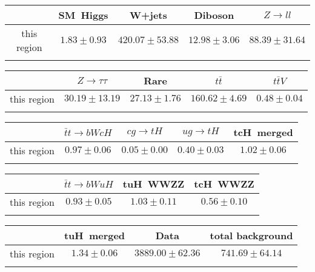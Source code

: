 \centering
\begin{tabular}{ccccc} \toprule\toprule
 & SM~Higgs & W+jets & Diboson & $Z\to ll$\\\midrule
this region & $1.83\pm0.93$ & $420.07\pm53.88$ & $12.98\pm3.06$ & $88.39\pm31.64$\\
\bottomrule\bottomrule\\
\end{tabular}
\begin{tabular}{ccccc} \toprule\toprule
 & $Z\to \tau\tau$ & Rare & $t\bar{t}$ & $t\bar{t}V$\\\midrule
this region & $30.19\pm13.19$ & $27.13\pm1.76$ & $160.62\pm4.69$ & $0.48\pm0.04$\\
\bottomrule\bottomrule\\
\end{tabular}
\begin{tabular}{ccccc} \toprule\toprule
 & $\bar{t}t\to bWcH$ & $cg\to tH$ & $ug\to tH$ & tcH~merged\\\midrule
this region & $0.97\pm0.06$ & $0.05\pm0.00$ & $0.40\pm0.03$ & $1.02\pm0.06$\\
\bottomrule\bottomrule\\
\end{tabular}
\begin{tabular}{cccc} \toprule\toprule
 & $\bar{t}t\to bWuH$ & tuH~WWZZ & tcH~WWZZ\\\midrule
this region & $0.93\pm0.05$ & $1.03\pm0.11$ & $0.56\pm0.10$\\
\bottomrule\bottomrule\\
\end{tabular}
\begin{tabular}{cccc} \toprule\toprule
 & tuH~merged & Data & total background\\\midrule
this region & $1.34\pm0.06$ & $3889.00\pm62.36$ & $741.69\pm64.14$\\
\bottomrule\bottomrule\\
\end{tabular}
